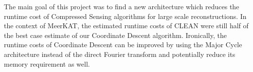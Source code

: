  


The main goal of this project was to find a new architecture which reduces the runtime cost of Compressed Sensing algorithms for large scale reconstructions. In the context of MeerKAT, the estimated runtime costs of CLEAN were still half of the best case estimate of our Coordinate Descent algorithm. Ironically, the runtime costs of Coordinate Descent can be improved by using the Major Cycle architecture instead of the direct Fourier transform and potentially reduce its memory requirement as well.














 